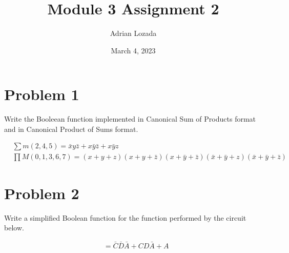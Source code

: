 \documentclass{article}
\author{Adrian Lozada}
\title{Module 3 Assignment 2}
\date{March 4, 2023}
\begin{document}
    \maketitle
    \newpage
    \section{Problem 1}
    \begin{flushleft}
        Write the Booleean function implemented in Canonical Sum of Products format
        and in Canonical Product of Sums format.
    \end{flushleft}
    \begin{align*}
        &\sum m(2, 4, 5) = \bar{x}y\bar{z} + x\bar{y}\bar{z} + x\bar{y}z \\
        &\prod M(0, 1, 3, 6, 7) = (x + y + z)(x + y + \bar{z})(x + \bar{y} + \bar{z})(\bar{x} + \bar{y} + z)(\bar{x} + \bar{y} + \bar{z})
    \end{align*}
    \section{Problem 2}
    \begin{flushleft}
        Write a simplified Boolean function for the function performed by the circuit below.
    \end{flushleft}
    \begin{align*}
        &= \bar{C}\bar{D}\bar{A} + CD\bar{A} + A
    \end{align*}
\end{document}
